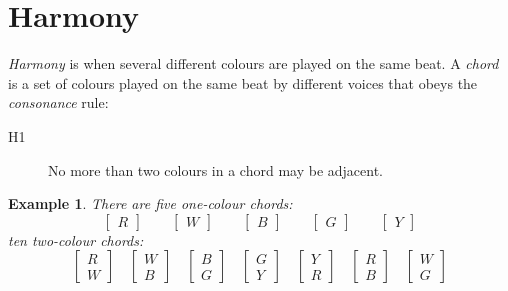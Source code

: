 \documentclass{scrartcl}
\newtheorem{example}{Example}
\begin{document}
\section{Harmony}
\emph{Harmony} is when several different colours are played on the same beat. A \emph{chord} is a set of colours played on the same beat by different voices that obeys the \emph{consonance} rule:
\begin{description}
	\item[H1] No more than two colours in a chord may be adjacent.
\end{description}
\begin{example}
There are five one-colour chords:
\begin{equation}\nonumber
\begin{bmatrix}
R
\end{bmatrix}
\qquad
\begin{bmatrix}
W
\end{bmatrix}
\qquad
\begin{bmatrix}
B
\end{bmatrix}
\qquad
\begin{bmatrix}
G
\end{bmatrix}
\qquad
\begin{bmatrix}
Y
\end{bmatrix}
\end{equation}
ten two-colour chords:
\begin{equation}\nonumber
\begin{bmatrix}
R \\ W
\end{bmatrix}
\quad
\begin{bmatrix}
W \\ B
\end{bmatrix}
\quad
\begin{bmatrix}
B \\ G
\end{bmatrix}
\quad
\begin{bmatrix}
G \\ Y
\end{bmatrix}
\quad
\begin{bmatrix}
Y \\ R
\end{bmatrix}
\quad
\begin{bmatrix}
R \\ B
\end{bmatrix}
\quad
\begin{bmatrix}
W \\ G
\end{bmatrix}

\end{equation}
\end{example}
\end{document}
